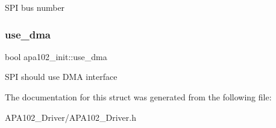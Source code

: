 S\+PI bus number \mbox{\label{structapa102__init_a3e993d7cb6a0bab675e6a3ce46f87acb}} 
\subsubsection{\texorpdfstring{use\+\_\+dma}{use\_dma}}
{\footnotesize\ttfamily bool apa102\+\_\+init\+::use\+\_\+dma}

S\+PI should use D\+MA interface 

The documentation for this struct was generated from the following file\+:\begin{DoxyCompactItemize}
\item 
A\+P\+A102\+\_\+\+Driver/A\+P\+A102\+\_\+\+Driver.\+h\end{DoxyCompactItemize}
